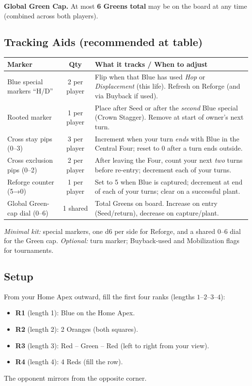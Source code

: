 \documentclass[11pt]{article}
\begin{document}
\smallskip
\noindent\textbf{Global Green Cap.} At most \textbf{6 Greens total} may be on the board at any time (combined across both players).

\subsection*{Tracking Aids (recommended at table)}
\begin{tabularx}{\linewidth}{@{}l c X@{}}
\toprule
\textbf{Marker} & \textbf{Qty} & \textbf{What it tracks / When to adjust} \\
\midrule
Blue special markers “H/D” & 2 per player & Flip when that Blue has used \emph{Hop} or \emph{Displacement} (this life). Refresh on Reforge (and via Buyback if used). \\
Rooted marker & 1 per player & Place after Seed or after the \emph{second} Blue special (Crown Stagger). Remove at start of owner’s next turn. \\
Cross stay pips (0–3) & 3 per player & Increment when your turn \emph{ends} with Blue in the Central Four; reset to 0 after a turn ends outside. \\
Cross exclusion pips (0–2) & 2 per player & After leaving the Four, count your next \emph{two} turns before re-entry; decrement each of your turns. \\
Reforge counter (5→0) & 1 per player & Set to 5 when Blue is captured; decrement at end of each of your turns; clear on a successful plant. \\
Global Green-cap dial (0–6) & 1 shared & Total Greens on board. Increase on entry (Seed/return), decrease on capture/plant. \\
\bottomrule
\end{tabularx}

\smallskip
\noindent\textit{Minimal kit:} special markers, one d6 per side for Reforge, and a shared 0–6 dial for the Green cap. \textit{Optional:} turn marker; Buyback-used and Mobilization flags for tournaments.

\subsection*{Setup}
From your Home Apex outward, fill the first four ranks (lengths \(1\text{–}2\text{–}3\text{–}4\)):
\begin{itemize}[leftmargin=1.3em,itemsep=0.2em]
  \item \textbf{R1} (length 1): Blue on the Home Apex.
  \item \textbf{R2} (length 2): 2 Oranges (both squares).
  \item \textbf{R3} (length 3): Red – Green – Red (left to right from your view).
  \item \textbf{R4} (length 4): 4 Reds (fill the row).
\end{itemize}
The opponent mirrors from the opposite corner.
\end{document}
